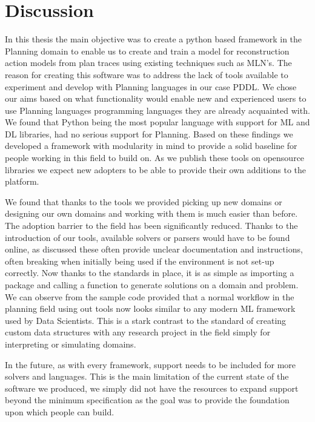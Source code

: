 \chapter{Discussion}
In this thesis the main objective was to create a python based framework in the Planning domain to enable us to create and train a model for reconstruction action models from plan traces using existing techniques such as MLN's.
The reason for creating this software was to address the lack of tools available to experiment and develop with Planning languages in our case PDDL.
We chose our aims based on what functionality would enable new and experienced users to use Planning languages programming languages they are already acquainted with.
We found that Python being the most popular language with support for ML and DL libraries, had no serious support for Planning.
Based on these findings we developed a framework with modularity in mind to provide a solid baseline for people working in this field to build on.
As we publish these tools on opensource libraries we expect new adopters to be able to provide their own additions to the platform.

We found that thanks to the tools we provided picking up new domains or designing our own domains and working with them is much easier than before.
The adoption barrier to the field has been significantly reduced.
Thanks to the introduction of our tools, available solvers or parsers would have to be found online, as discussed these often provide unclear documentation and instructions, often breaking when initially being used if the environment is not set-up correctly.
Now thanks to the standards in place, it is as simple as importing a package and calling a function to generate solutions on a domain and problem.
We can observe from the sample code provided that a normal workflow in the planning field using out tools now looks similar to any modern ML framework used by Data Scientists.
This is a stark contrast to the standard of creating custom data structures with any research project in the field simply for interpreting or simulating domains.

In the future, as with every framework, support needs to be included for more solvers and languages.
This is the main limitation of the current state of the software we produced, we simply did not have the resources to expand support beyond the minimum specification as the goal was to provide the foundation upon which people can build.


